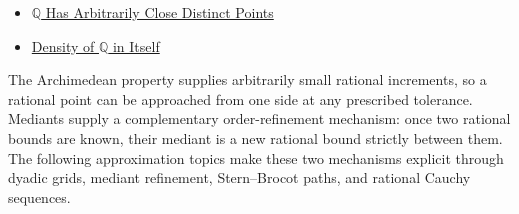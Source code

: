 \begin{dependencies}
\begin{itemize}
  \item \hyperref[thm:q-has-arbitrarily-close-distinct-points]{$\mathbb{Q}$ Has Arbitrarily Close Distinct Points}
  \item \hyperref[thm:density-of-q]{Density of $\mathbb{Q}$ in Itself}
\end{itemize}
\end{dependencies}

\begin{remark}
\label{rem:rational-refinement-and-bounds}
The Archimedean property supplies arbitrarily small rational increments, so a
rational point can be approached from one side at any prescribed tolerance.
Mediants supply a complementary order-refinement mechanism: once two rational
bounds are known, their mediant is a new rational bound strictly between them.
The following approximation topics make these two mechanisms explicit through
dyadic grids, mediant refinement, Stern--Brocot paths, and rational Cauchy
sequences.
\end{remark}
